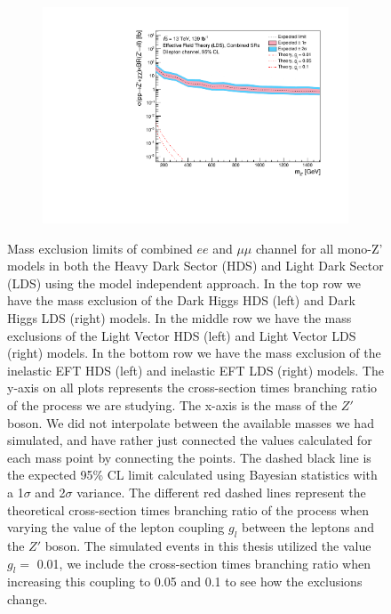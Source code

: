 \documentclass[12pt, a4paper]{book}
\begin{document}
\begin{figure}[!ht]
\begin{subfigure}[b]{0.49\textwidth}
   \end{subfigure}
   \hfill
   \begin{subfigure}[b]{0.49\textwidth}
      \centering
      \includegraphics[width=1\textwidth]{Limits/Model_independent/EFT_LDS/mass_exclusion_comb.pdf}
   \end{subfigure}
   \caption[Mass exclusion limits of combined $ee$ and $\mu\mu$ channel for all mono-Z' models using the model independent approach]{Mass exclusion limits of combined $ee$ and $\mu\mu$ channel for all mono-Z' models in both the Heavy Dark Sector (HDS) and Light Dark Sector (LDS) using the model independent approach. 
   In the top row we have the mass exclusion of the Dark Higgs HDS (left) and Dark Higgs LDS (right) models. In the middle row we have the mass exclusions of the Light Vector HDS (left) and Light Vector LDS (right) models. In the bottom row we have the mass exclusion of the 
   inelastic EFT HDS (left) and inelastic EFT LDS (right) models.
   The y-axis on all plots represents the cross-section times branching ratio of the process we are studying. The x-axis is the mass of the $Z'$ boson. We did not interpolate between the available masses we had simulated, 
   and have rather just connected the values calculated for each mass point by connecting the points. The dashed black line is the expected 95\% CL limit calculated using Bayesian statistics with a 1$\sigma$ and 2$\sigma$ variance. 
   The different red dashed lines represent the theoretical cross-section times branching ratio of the process when varying the value of the lepton coupling $g_l$ between the leptons and the $Z'$ boson. The simulated events in this thesis utilized the value $g_l=$ 0.01, we include the cross-section times branching ratio when increasing this coupling to 0.05 and 0.1 to see how the exclusions change. 
   }\label{fig:model_indep_mono_Zp_excl}
\end{figure}
\end{document}
